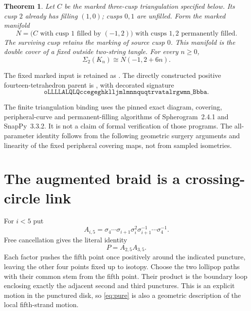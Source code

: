 \documentclass[11pt]{article}
\newtheorem{theorem}{Theorem}
\newcommand{\Sig}{\Sigma_2}
\begin{document}
\begin{theorem}\label{thm:binding}
Let $C$ be the marked three-cusp triangulation specified below.
Its cusp $2$ already has
filling $(1,0)$; cusps $0,1$ are unfilled. Form the marked manifold
\[
 N=\bigl(C\text{ with cusp }1\text{ filled by }(-1,2)\bigr)
       \text{ with cusps }1,2\text{ permanently filled}.
\]
The surviving cusp retains the marking of source cusp $0$.
This manifold is the double cover of a fixed outside two-string tangle.
For every $n\ge0$,
\begin{equation}\label{eq:uniform}
                       \Sig(K_n)\cong N(-1,2+6n).
\end{equation}
\end{theorem}

The fixed marked input is retained as
.
The directly constructed positive fourteen-tetrahedron parent is
, with decorated signature
\[
\texttt{oLLLLALQLQccegeghklljmlmnnquqtrvatalrgwmn\_Bbba}.
\]

The finite triangulation binding uses the pinned exact diagram,
covering, peripheral-curve and permanent-filling algorithms of
Spherogram~2.4.1 and SnapPy~3.3.2. It is not a claim of formal
verification of those programs. The all-parameter identity follows
from the following geometric surgery arguments and linearity of the
fixed peripheral covering maps, not from sampled isometries.

\section{The augmented braid is a crossing-circle link}

For $i<5$ put
\[
 A_{i,5}=\sigma_4\cdots\sigma_{i+1}\sigma_i^2
             \sigma_{i+1}^{-1}\cdots\sigma_4^{-1}.
\]
Free cancellation gives the literal identity
\begin{equation}\label{eq:pure}
                       P=A_{2,5}A_{3,5}.
\end{equation}
Each factor pushes the fifth point once positively around the indicated
puncture, leaving the other four points fixed up to isotopy.
Choose the two lollipop paths with their common stem from the fifth
point. Their product is the boundary loop enclosing exactly the
adjacent second and third punctures. This is an explicit motion in the
punctured disk, so \eqref{eq:pure} is also a geometric description of
the local fifth-strand motion.
\end{document}

